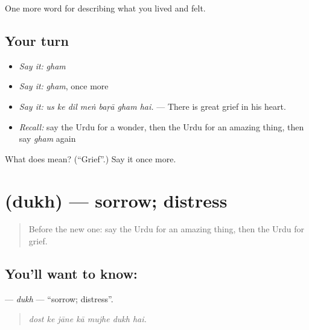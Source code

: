 \begin{grammarlens}[title={What you've built}]
One more word for describing what you lived and felt.
\end{grammarlens}

\subsection*{Your turn}
\begin{itemize}
\raggedright
  \item \emph{Say it:} \emph{gham}
  \item \emph{Say it:} \emph{gham}, once more
  \item \emph{Say it:} \emph{us ke dil meṅ baṛā gham hai.} — There is great grief in his heart.
  \item \emph{Recall:} say the Urdu for a wonder, then the Urdu for an amazing thing, then say \emph{gham} again
\end{itemize}

\begin{tcolorbox}[breakable,colback=teal!4,colframe=teal!35!black,title={Before you move on}]
What does  mean? (\textquotedblleft{}Grief\textquotedblright{}.) Say it once more.
\end{tcolorbox}
\section[\texorpdfstring{\ur{دکھ} (dukh)}{دکھ (dukh)}]{ (dukh) — sorrow; distress}

\label{lesson:UR-C443-dukh}



\begin{quote}
Before the new one: say the Urdu for an amazing thing, then the Urdu for grief.
\end{quote}

\subsection*{You'll want to know: }
\textbf{} — \emph{dukh} — \textquotedblleft{}sorrow; distress\textquotedblright{}.

\begin{quote}
      
\end{quote}

\begin{quote}
\emph{dost ke jāne kā mujhe dukh hai.}
\end{quote}


